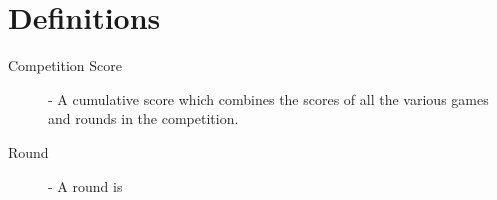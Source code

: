 \section {Definitions}

\begin {description}

\item [Competition Score] - A cumulative score which combines the scores of all the various games and rounds in the competition.

\item [Round] - A round is 

\end {description}



